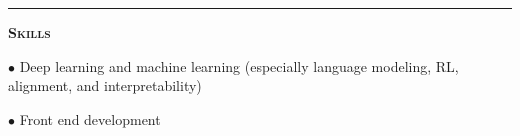 \documentclass[11 pt]{article}
\begin{document}

\hrule

\vspace{8 pt}
\begin{center}\begin{Large}\textsc{\textbf{Skills}\\}\end{Large}\end{center}


$\bullet$ Deep learning and machine learning (especially language modeling, RL, alignment, and interpretability)


$\bullet$ Front end development %
\end{document}
